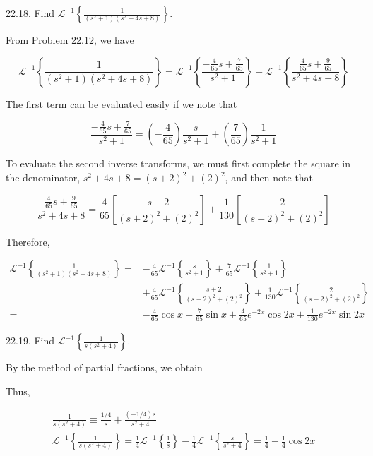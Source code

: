 \documentclass[10pt]{article}
\begin{document}
22.18. Find $\mathscr{L}^{-1}\left\{\frac{1}{\left(s^{2}+1\right)\left(s^{2}+4 s+8\right)}\right\}$.

From Problem 22.12, we have

$$
\mathscr{L}^{-1}\left\{\frac{1}{\left(s^{2}+1\right)\left(s^{2}+4 s+8\right)}\right\}=\mathscr{L}^{-1}\left\{\frac{-\frac{4}{65} s+\frac{7}{65}}{s^{2}+1}\right\}+\mathscr{L}^{-1}\left\{\frac{\frac{4}{65} s+\frac{9}{65}}{s^{2}+4 s+8}\right\}
$$

The first term can be evaluated easily if we note that

$$
\frac{-\frac{4}{65} s+\frac{7}{65}}{s^{2}+1}=\left(-\frac{4}{65}\right) \frac{s}{s^{2}+1}+\left(\frac{7}{65}\right) \frac{1}{s^{2}+1}
$$

To evaluate the second inverse transforms, we must first complete the square in the denominator, $s^{2}+4 s+8=(s+2)^{2}+(2)^{2}$, and then note that

$$
\frac{\frac{4}{65} s+\frac{9}{65}}{s^{2}+4 s+8}=\frac{4}{65}\left[\frac{s+2}{(s+2)^{2}+(2)^{2}}\right]+\frac{1}{130}\left[\frac{2}{(s+2)^{2}+(2)^{2}}\right]
$$

Therefore,

$$
\begin{aligned}
\mathscr{L}^{-1}\left\{\frac{1}{\left(s^{2}+1\right)\left(s^{2}+4 s+8\right)}\right\}= & -\frac{4}{65} \mathscr{L}^{-1}\left\{\frac{s}{s^{2}+1}\right\}+\frac{7}{65} \mathscr{L}^{-1}\left\{\frac{1}{s^{2}+1}\right\} \\
& +\frac{4}{65} \mathscr{L}^{-1}\left\{\frac{s+2}{(s+2)^{2}+(2)^{2}}\right\}+\frac{1}{130} \mathscr{L}^{-1}\left\{\frac{2}{(s+2)^{2}+(2)^{2}}\right\} \\
= & -\frac{4}{65} \cos x+\frac{7}{65} \sin x+\frac{4}{65} e^{-2 x} \cos 2 x+\frac{1}{130} e^{-2 x} \sin 2 x
\end{aligned}
$$

22.19. Find $\mathscr{L}^{-1}\left\{\frac{1}{s\left(s^{2}+4\right)}\right\}$.

By the method of partial fractions, we obtain

Thus,

$$
\begin{gathered}
\frac{1}{s\left(s^{2}+4\right)} \equiv \frac{1 / 4}{s}+\frac{(-1 / 4) s}{s^{2}+4} \\
\mathscr{L}^{-1}\left\{\frac{1}{s\left(s^{2}+4\right)}\right\}=\frac{1}{4} \mathscr{L}^{-1}\left\{\frac{1}{s}\right\}-\frac{1}{4} \mathscr{L}^{-1}\left\{\frac{s}{s^{2}+4}\right\}=\frac{1}{4}-\frac{1}{4} \cos 2 x
\end{gathered}
$$
\end{document}

